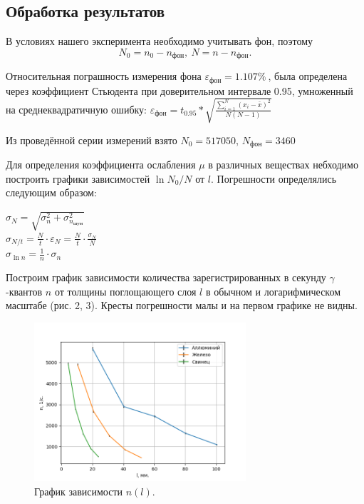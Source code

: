 \documentclass[a4paper,12pt]{article} %
\begin{document}
\subsection*{Обработка результатов}
	В условиях нашего эксперимента необходимо учитывать фон, поэтому
	\begin{equation*}
		N_0 = n_0 - n_\text{фон}, \ N = n - n_\text{фон}.
	\end{equation*}
 
    Относительная пограшность измерения фона           $ \varepsilon_{\text{фон}} = 1.107 \%\ $, была определена через коэффициент Стьюдента при доверительном интервале 0.95, умноженный на среднеквадратичную ошибку: $ \varepsilon_{\text{фон}} = t_{0.95} * \sqrt{\frac{\sum_{i=1}^{N}\left(x_i - \bar{x}\right)^2}{N\left(N - 1\right)}}$

    Из проведённой серии измерений взято $N_0 = 517050$, $N_{\text{фон}} = 3460$
    
	Для определения коэффициента ослабления $\mu$ в различных веществах небходимо построить графики  зависимостей $\ln N_0/N$ от $l$. Погрешности определялись следующим образом:
    \begin{center}
		$
		\sigma_N = \sqrt{\sigma_{n}^2 + \sigma_{n_{\text{шум}}}^2}
		$\\
        $
		\sigma_{N/t} = \frac{N}{t} \cdot \varepsilon_{N} = \frac{N}{t} \cdot \frac{\sigma_N}{N}
		$\\
		$
		\sigma_{\ln n} = \frac{1}{n} \cdot \sigma_n
		$\\
	\end{center}
		
	
Построим график зависимости количества зарегистрированных в секунду $\gamma$-квантов $n$ от толщины поглощающего слоя $l$ в обычном и логарифмическом масштабе (рис. 2, 3). Кресты погрешности малы и на первом графике не видны.
	
	\begin{figure}[H]
		\centering
        \centering
        \includegraphics[width=0.7\textwidth]{graph1.png}
        
        \caption{График зависимости $n(l)$.}
        \label{fig:nl}
	\end{figure}
 
\end{document}
